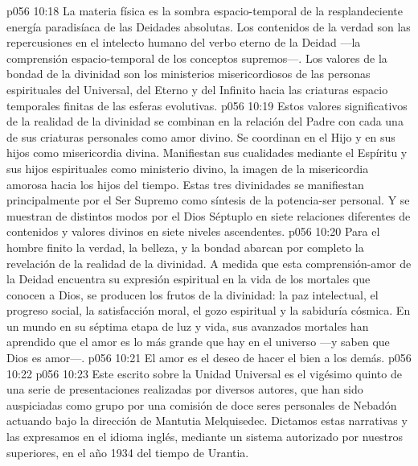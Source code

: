 \vs p056 10:18 La materia física es la sombra espacio\hyp{}temporal de la resplandeciente energía paradisíaca de las Deidades absolutas. Los contenidos de la verdad son las repercusiones en el intelecto humano del verbo eterno de la Deidad ---la comprensión espacio\hyp{}temporal de los conceptos supremos---. Los valores de la bondad de la divinidad son los ministerios misericordiosos de las personas espirituales del Universal, del Eterno y del Infinito hacia las criaturas espacio temporales finitas de las esferas evolutivas.
\vs p056 10:19 Estos valores significativos de la realidad de la divinidad se combinan en la relación del Padre con cada una de sus criaturas personales como amor divino. Se coordinan en el Hijo y en sus hijos como misericordia divina. Manifiestan sus cualidades mediante el Espíritu y sus hijos espirituales como ministerio divino, la imagen de la misericordia amorosa hacia los hijos del tiempo. Estas tres divinidades se manifiestan principalmente por el Ser Supremo como síntesis de la potencia\hyp{}ser personal. Y se muestran de distintos modos por el Dios Séptuplo en siete relaciones diferentes de contenidos y valores divinos en siete niveles ascendentes.
\vs p056 10:20 \pc Para el hombre finito la verdad, la belleza, y la bondad abarcan por completo la revelación de la realidad de la divinidad. A medida que esta comprensión\hyp{}amor de la Deidad encuentra su expresión espiritual en la vida de los mortales que conocen a Dios, se producen los frutos de la divinidad: la paz intelectual, el progreso social, la satisfacción moral, el gozo espiritual y la sabiduría cósmica. En un mundo en su séptima etapa de luz y vida, sus avanzados mortales han aprendido que el amor es lo más grande que hay en el universo ---y saben que Dios es amor---.
\vs p056 10:21 \pc El amor es el deseo de hacer el bien a los demás.
\vs p056 10:22 
\separatorline
\vsetoff
\vs p056 10:23 \pc Este escrito sobre la Unidad Universal es el vigésimo quinto de una serie de presentaciones realizadas por diversos autores, que han sido auspiciadas como grupo por una comisión de doce seres personales de Nebadón actuando bajo la dirección de Mantutia Melquisedec. Dictamos estas narrativas y las expresamos en el idioma inglés, mediante un sistema autorizado por nuestros superiores, en el año 1934 del tiempo de Urantia.
